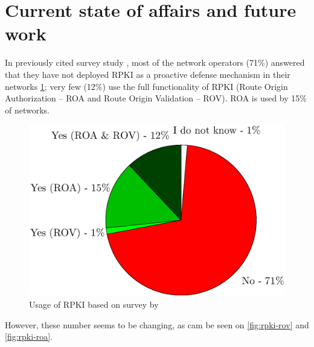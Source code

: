 
\section{Current state of affairs and future work}
\label{now}

In previously cited survey study \cite{Sermpezis2018}, most of the network operators (71\%) answered that they have not deployed RPKI as a proactive defense mechanism in their networks \ref{fig:usagerpki}; very few (12\%) use the full functionality of RPKI (Route Origin Authorization -- ROA and Route Origin Validation -- ROV). ROA is used by 15\% of networks.

\begin{figure}[ht]
 \begin{center}
\includegraphics[width = 0.8\linewidth]{./fig/fig_survey_use_RPKI}
 \end{center}
 \caption{Usage of RPKI based on survey by \cite{Sermpezis2018}} \label{fig:usagerpki}
\end{figure}

However, these number seems to be changing, as cam be seen on \ref{fig:rpki-rov} and \ref{fig:rpki-roa}.

